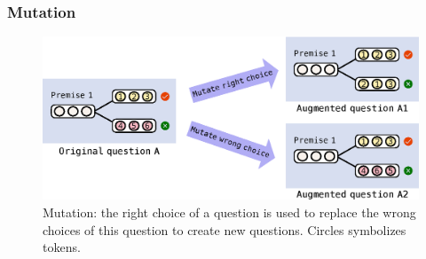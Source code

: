 

\subsubsection{Mutation}
\label{sec:mutate}
\begin{figure}[th]
        \centering
        \includegraphics[width=0.75\columnwidth]{figure/revised_mutation.eps}
        \caption{Mutation: the right choice of a question
                is used to replace the wrong choices of this question to create
                new questions. Circles symbolizes tokens.}
        \label{fig:mutation}
\end{figure}


